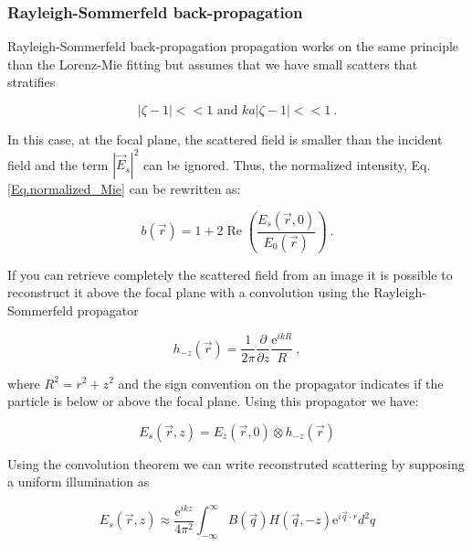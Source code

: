 \subsubsection{ Rayleigh-Sommerfeld back-propagation}





Rayleigh-Sommerfeld back-propagation \cite{wilson_3d_2012} propagation works on the same principle than the Lorenz-Mie fitting but assumes that we have small scatters that stratifies

\begin{equation}
	|\zeta - 1| << 1 \text{ and } ka|\zeta - 1| << 1 ~.
\end{equation}

In this case, at the focal plane, the scattered field is smaller than the incident field and the term $|\vec{E}_s|^2$ can be ignored. Thus, the normalized intensity, Eq.\ref{Eq.normalized_Mie} can be rewritten as:

\begin{equation}
	b(\vec{r})= 1 + 2\operatorname{Re}\left( \frac{E_s(\vec{r},0)}{E_0(\vec{r})} \right) ~.
\end{equation}

If you can retrieve completely the scattered field from an image it is possible to reconstruct it above the focal plane with a convolution using the Rayleigh-Sommerfeld propagator \cite{goodman_introduction_2005}

\begin{equation}
	h_{-z}(\vec{r}) = \frac{1}{2 \pi} \frac{\partial}{\partial z} \frac{\mathrm{e}^{ikR}}{R} ~,
\end{equation}

where $ R^2 = r^2 + z^2 $ and the sign convention on the propagator indicates if the particle is below or above the focal plane. Using this propagator we have:

\begin{equation}
	E_s(\vec{r}, z) = E_z(\vec{r}, 0) \otimes h_{-z}(\vec{r})
\end{equation}

Using the convolution theorem \cite{cheong_strategies_2010, goodman_introduction_2005, sherman_application_1967,schnars_digital_1994} we can write reconstruted scattering by supposing a uniform illumination as 

\begin{equation}
	E_s(\vec{r}, z) \approx \frac{\mathrm{e}^{ikz}}{4\pi ^2}
	\int ^\infty _{- \infty}
	B(\vec{q}) H(\vec{q}, -z) \mathrm{e}^{i \vec{q} \cdot r} d^2 q
	\label{Eq.RS}
\end{equation}

